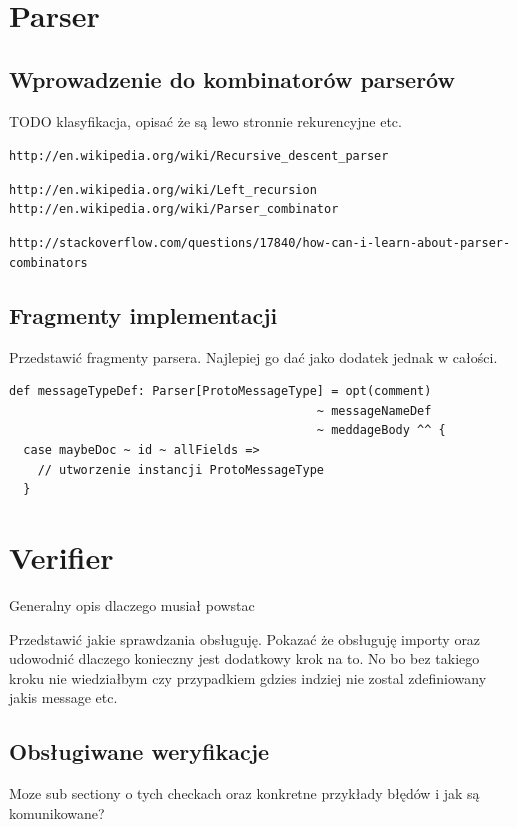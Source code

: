 \documentclass[pdflatex,11pt]{aghdpl}
\begin{document}




\section{Parser}
\subsection{Wprowadzenie do kombinatorów parserów}
TODO klasyfikacja, opisać że są lewo stronnie rekurencyjne etc.

\verb|http://en.wikipedia.org/wiki/Recursive_descent_parser|

\verb|http://en.wikipedia.org/wiki/Left_recursion|
\verb|http://en.wikipedia.org/wiki/Parser_combinator|

\verb|http://stackoverflow.com/questions/17840/how-can-i-learn-about-parser-combinators|

\subsection{Fragmenty implementacji}
Przedstawić fragmenty parsera. Najlepiej go dać jako dodatek jednak w całości.

\begin{lstlisting}
def messageTypeDef: Parser[ProtoMessageType] = opt(comment) 
                                           ~ messageNameDef
                                           ~ meddageBody ^^ {
  case maybeDoc ~ id ~ allFields =>
    // utworzenie instancji ProtoMessageType
  }
\end{lstlisting}


\section{Verifier}
Generalny opis dlaczego musiał powstac

Przedstawić jakie sprawdzania obsługuję. 
Pokazać że obsługuję importy oraz udowodnić dlaczego konieczny jest dodatkowy krok na to.
No bo bez takiego kroku nie wiedziałbym czy przypadkiem gdzies indziej nie zostal zdefiniowany jakis message etc.

\subsection{Obsługiwane weryfikacje}
Moze sub sectiony o tych checkach oraz konkretne przykłady błędów i jak są komunikowane?
\end{document}
